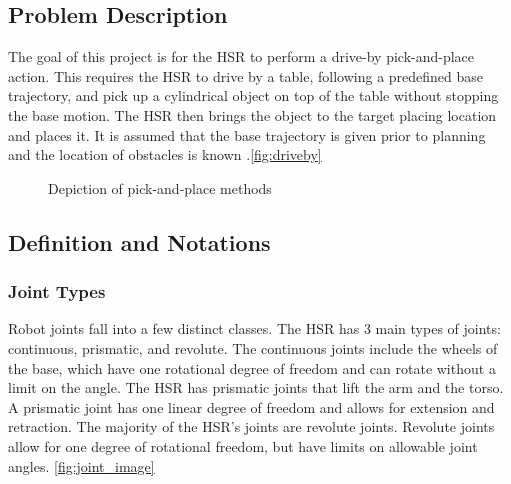 \documentclass[12pt]{article}
\begin{document}
    \subsection{Problem Description}
        The goal of this project is for the HSR to perform a drive-by pick-and-place action. This requires the HSR to drive by a table, following a predefined base trajectory, and pick up a cylindrical object on top of the table without stopping the base motion. The HSR then brings the object to the target placing location and places it. It is assumed that the base trajectory is given prior to planning and the location of obstacles is known .\cref{fig:driveby}
        \begin{figure}[ht]
            \centering
            \quad
            \caption{Depiction of pick-and-place methods}
            \label{fig:base_roll_fig}
        \end{figure}

    
    \subsection{Definition and Notations}

        \subsubsection{Joint Types}
            Robot joints fall into a few distinct classes. The HSR has 3 main types of joints: continuous, prismatic, and revolute. The continuous joints include the wheels of the base, which have one rotational degree of freedom and can rotate without a limit on the angle. The HSR has prismatic joints that lift the arm and the torso. A prismatic joint has one linear degree of freedom and allows for extension and retraction. The majority of the HSR's joints are revolute joints. Revolute joints allow for one degree of rotational freedom, but have limits on allowable joint angles.\cite{lavalle_planning_2006} \cref{fig:joint_image}
\end{document}
